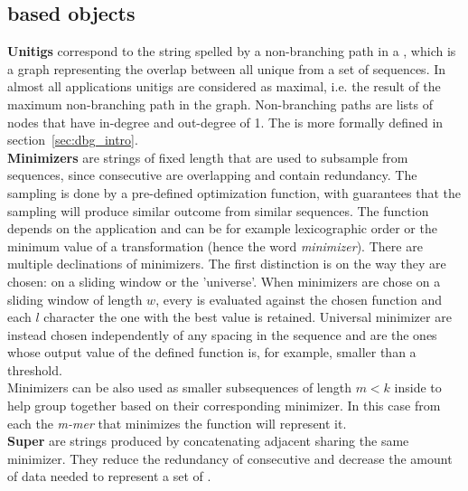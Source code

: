 \subsection{\kmer based objects}
\label{sec:kmerobjects}
\textbf{Unitigs} correspond to the string spelled by a non-branching path in a \dbg, which is a graph representing the overlap between all unique \kmers from a set of sequences. In almost all applications unitigs are considered as maximal, i.e. the result of the maximum non-branching path in the graph. Non-branching paths are lists of nodes that have in-degree and out-degree of 1. The \dbg is more formally defined in section~\ref{sec:dbg_intro}.\\
\textbf{Minimizers} are strings of fixed length that are used to subsample \kmers from sequences, since consecutive \kmers are overlapping and contain redundancy. The sampling is done by a pre-defined optimization function, with guarantees that the sampling will produce similar outcome from similar sequences. The function depends on the application and can be for example lexicographic order or the minimum value of a transformation (hence the word \emph{minimizer}). There are multiple declinations of minimizers. The first distinction is on the way they are chosen: on a sliding window or the 'universe'. When minimizers are chose on a sliding window of length $w$, every \kmer is evaluated against the chosen function and each $l$ character the one with the best value is retained. Universal minimizer are instead chosen independently of any spacing in the sequence and are the ones whose output value of the defined function is, for example, smaller than a threshold. \\
Minimizers can be also used as smaller subsequences of length $m < k$ inside \kmers to help group together \kmers based on their corresponding minimizer. In this case from each \kmer the \emph{m-mer} that minimizes the function will represent it. \\
\textbf{Super\kmers} are strings produced by concatenating adjacent \kmers sharing the same minimizer. They reduce the redundancy of consecutive \kmers and decrease the amount of data needed to represent a set of \kmers. 
